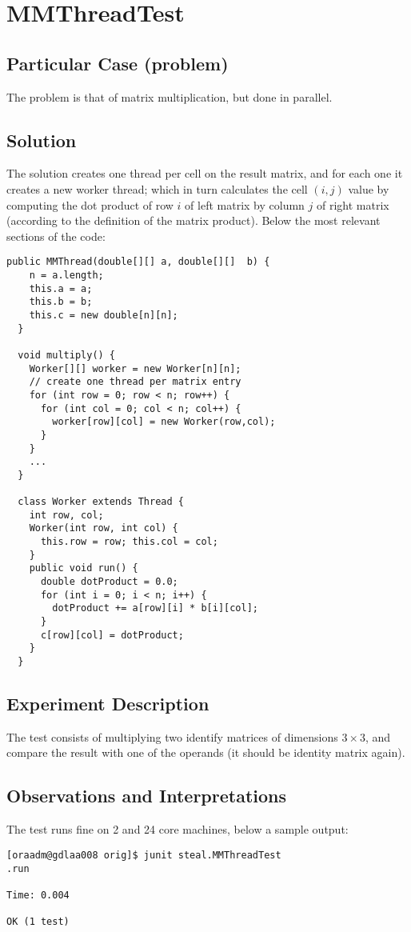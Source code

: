 \section{\textbf{MMThreadTest}}

\subsection{Particular Case (problem)}
The problem is that of matrix multiplication, but done in parallel.

\subsection{Solution}
The solution creates one thread per cell on the result matrix, and for
each one it creates a new worker thread; which in turn calculates the
cell $(i,j)$ value by computing the dot product of row $i$ of left
matrix by column $j$ of right matrix (according to the definition of
the matrix product). Below the most relevant sections of the code: \\

\begin{lstlisting}[style=numbers]
  public MMThread(double[][] a, double[][]  b) {
    n = a.length;
    this.a = a;
    this.b = b;
    this.c = new double[n][n];
  }
  
  void multiply() {
    Worker[][] worker = new Worker[n][n];
    // create one thread per matrix entry
    for (int row = 0; row < n; row++) {
      for (int col = 0; col < n; col++) {
        worker[row][col] = new Worker(row,col);
      }
    }
    ...
  }

  class Worker extends Thread {
    int row, col;
    Worker(int row, int col) {
      this.row = row; this.col = col;
    }
    public void run() {
      double dotProduct = 0.0;
      for (int i = 0; i < n; i++) {
        dotProduct += a[row][i] * b[i][col];
      }
      c[row][col] = dotProduct;
    }
  }  
\end{lstlisting}
\hfill

\subsection{Experiment Description}
The test consists of multiplying two identify matrices of dimensions
$3 \times 3$, and compare the result with one of the operands (it
should be identity matrix again).

\subsection{Observations and Interpretations}
The test runs fine on 2 and 24 core machines, below a sample output: \\

\begin{verbatim}
[oraadm@gdlaa008 orig]$ junit steal.MMThreadTest
.run

Time: 0.004

OK (1 test)
\end{verbatim}
\hfill

